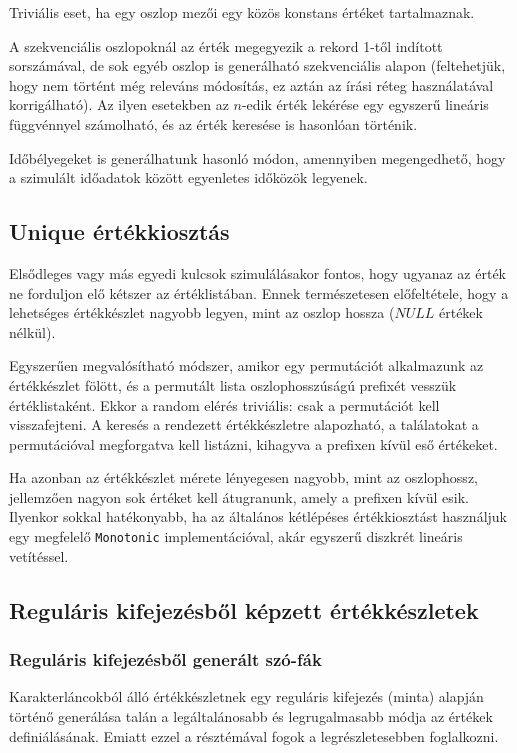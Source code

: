 \documentclass[
    parspace,
    noindent,
    nohyp,
]{elteiktdk}[2023/04/10]
\begin{document}
Triviális eset, ha egy oszlop mezői egy közös konstans értéket tartalmaznak.

A szekvenciális oszlopoknál az érték megegyezik a rekord 1-től indított sorszámával,
de sok egyéb oszlop is generálható szekvenciális alapon
(feltehetjük, hogy nem történt még releváns módosítás,
ez aztán az írási réteg használatával korrigálható).
Az ilyen esetekben az $n$-edik érték lekérése
egy egyszerű lineáris függvénnyel számolható,
és az érték keresése is hasonlóan történik.

Időbélyegeket is generálhatunk hasonló módon,
amennyiben megengedhető, hogy a szimulált időadatok között egyenletes időközök legyenek.

\subsection{Unique értékkiosztás}

Elsődleges vagy más egyedi kulcsok szimulálásakor fontos,
hogy ugyanaz az érték ne forduljon elő kétszer az értéklistában.
Ennek természetesen előfeltétele,
hogy a lehetséges értékkészlet nagyobb legyen, mint az oszlop hossza
($NULL$ értékek nélkül).

Egyszerűen megvalósítható módszer,
amikor egy permutációt alkalmazunk az értékkészlet fölött,
és a permutált lista oszlophosszúságú prefixét vesszük értéklistaként.
Ekkor a random elérés triviális: csak a permutációt kell visszafejteni.
A keresés a rendezett értékkészletre alapozható,
a találatokat a permutációval megforgatva kell listázni,
kihagyva a prefixen kívül eső értékeket.

Ha azonban az értékkészlet mérete lényegesen nagyobb, mint az oszlophossz,
jellemzően nagyon sok értéket kell átugranunk, amely a prefixen kívül esik.
Ilyenkor sokkal hatékonyabb,
ha az általános kétlépéses értékkiosztást használjuk
egy megfelelő \texttt{Monotonic} implementációval,
akár egyszerű diszkrét lineáris vetítéssel.


\subsection{Reguláris kifejezésből képzett értékkészletek}

\subsubsection{Reguláris kifejezésből generált szó-fák}

Karakterláncokból álló értékkészletnek egy reguláris kifejezés (minta)
alapján történő generálása talán a legáltalánosabb és legrugalmasabb módja
az értékek definiálásának.
Emiatt ezzel a résztémával fogok a legrészletesebben foglalkozni.
\end{document}
